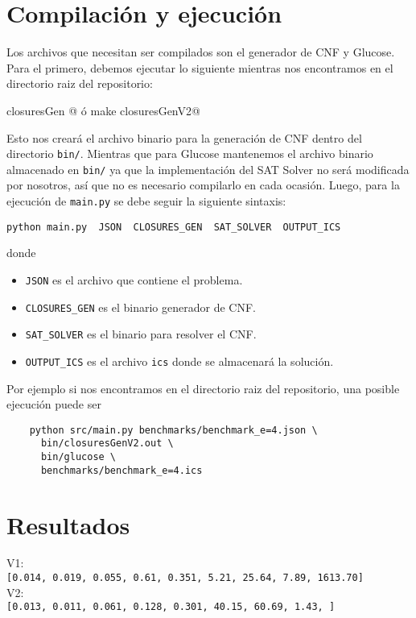 \documentclass[a4paper,10pt]{article}
\begin{document}
\section{Compilaci\'on y ejecuci\'on}
  Los archivos que necesitan ser compilados son el generador de CNF y Glucose. Para 
  el primero, debemos ejecutar lo siguiente mientras nos encontramos en el directorio 
  raiz del repositorio:

  \begin{center}
    \verb@make closuresGen  @ \'o \verb@  make closuresGenV2@
  \end{center}

  \noindent
  Esto nos crear\'a el archivo binario para la generaci\'on de CNF dentro del directorio 
  \verb|bin/|. Mientras que para Glucose mantenemos el archivo binario almacenado en 
  \verb|bin/| ya que la implementaci\'on del SAT Solver no ser\'a modificada por nosotros,
  as\'i que no es necesario compilarlo en cada ocasi\'on. Luego, para la ejecuci\'on de 
  \verb|main.py| se debe seguir la siguiente sintaxis:

  \begin{center}
    \verb|python main.py  JSON  CLOSURES_GEN  SAT_SOLVER  OUTPUT_ICS|
  \end{center}

  \noindent
  donde 

  \begin{itemize}
    \item \verb|JSON| es el archivo que contiene el problema.
    \item \verb|CLOSURES_GEN| es el binario generador de CNF.
    \item \verb|SAT_SOLVER| es el binario para resolver el CNF. 
    \item \verb|OUTPUT_ICS| es el archivo \verb|ics| donde se almacenar\'a la soluci\'on.
  \end{itemize}

  \noindent
  Por ejemplo si nos encontramos en el directorio raiz del repositorio, una posible ejecuci\'on 
  puede ser 

  \begin{verbatim}
    python src/main.py benchmarks/benchmark_e=4.json \
      bin/closuresGenV2.out \
      bin/glucose \  
      benchmarks/benchmark_e=4.ics
  \end{verbatim}


\section{Resultados}
  V1:\\
  \verb|[0.014, 0.019, 0.055, 0.61, 0.351, 5.21, 25.64, 7.89, 1613.70]|\\

  V2:\\
  \verb|[0.013, 0.011, 0.061, 0.128, 0.301, 40.15, 60.69, 1.43, ]|\\
\end{document}
